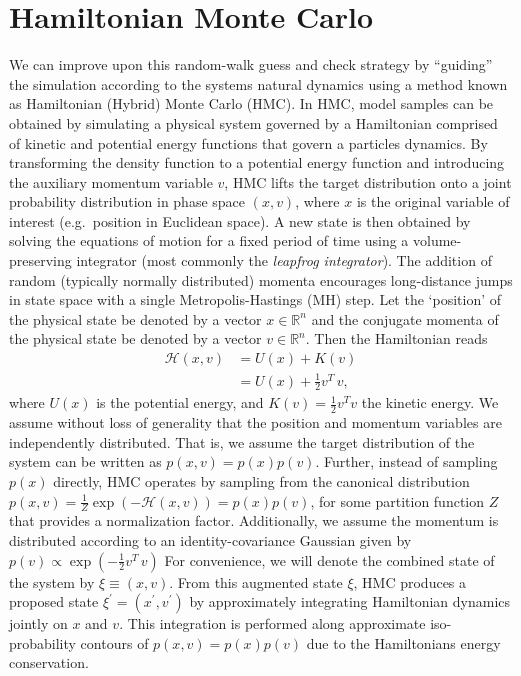 \documentclass[../main.tex]{subfiles}
\begin{document}
\section{Hamiltonian Monte Carlo}%
\label{sec:l2hmc_hmc}
We can improve upon this random-walk guess and check strategy by ``guiding'' the simulation according to the systems
natural dynamics using a method known as Hamiltonian (Hybrid) Monte Carlo (HMC).
%
In HMC, model samples can be obtained by simulating a physical system governed by a Hamiltonian comprised of kinetic
and potential energy functions that govern a particles dynamics.
%
By transforming the density function to a potential energy function and introducing the auxiliary momentum variable
$v$, HMC lifts the target distribution onto a joint probability distribution in phase space $(x, v)$, where $x$ is the
original variable of interest (e.g.\ position in Euclidean space).
%
A new state is then obtained by solving the equations of motion for a fixed period of time using a volume-preserving
integrator (most commonly the \emph{leapfrog integrator}).
%
The addition of random (typically normally distributed) momenta encourages
long-distance jumps in state space with a single Metropolis-Hastings (MH) step.
%
Let the `position' of the physical state be denoted by a vector $x
\in\mathbb{R}^{n}$ and the conjugate momenta of the physical state be denoted
by a vector $v \in\mathbb{R}^{n}$.
%
Then the Hamiltonian reads
%
\begin{align}
    \mathcal{H}(x, v) &= U(x) + K(v)\\
                      & = U(x) + \frac{1}{2} v^{T} \,v,
    \label{eq:hamiltonian}
\end{align}
%
where $U(x)$ is the potential energy, and $K(v)=\frac{1}{2}v^{T}v$ the kinetic energy.
%
We assume without loss of generality that the position and momentum variables are independently distributed.
%
That is, we assume the target distribution of the system can be written as $p(x, v) = p(x) p(v)$.
%
Further, instead of sampling $p(x)$ directly, HMC operates by sampling from the canonical distribution $p(x, v) =
\frac{1}{Z} \exp(-\mathcal{H}(x, v)) = p(x) p(v)$, for some partition function $Z$ that provides a normalization
factor.
%
Additionally, we assume the momentum is distributed according to an identity-covariance Gaussian given by $p(v) \propto
\exp{(-\frac{1}{2} v^{T} \, v)}$ For convenience, we will denote the combined state of the system by $\xi \equiv (x,
v)$.
%
From this augmented state $\xi$, HMC produces a proposed state $\xi^{\prime} = (x^{\prime}, v^{\prime})$ by
approximately integrating Hamiltonian dynamics jointly on $x$ and $v$.
%
This integration is performed along approximate iso-probability contours of $p(x, v) = p(x) p(v)$ due to the
Hamiltonians energy conservation.
%
\end{document}
